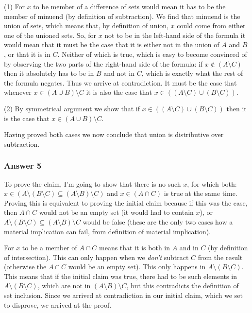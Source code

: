 \documentclass[11pt]{article}
\begin{document}
(1) For $x$ to be member of a difference of sets would mean it has to be the
member of minuend (by definition of subtraction).  We find that minuend is
the union of sets, which means that, by definition of union, $x$ could come
from either one of the unioned sets.  So, for $x$ not to be in the left-hand side
of the formula it would mean that it must be the case that it is either not in
the union of $A$ and $B$, or that it is in $C$.  Neither of which is true, which
is easy to become convinced of by observing the two parts of the right-hand side
of the formula: if $x \not \in (A \setminus C)$ then it absolutely has to be in
$B$ and not in $C$, which is exactly what the rest of the formula negates.
Thus we arrive at contradiction.  It must be the case that whenever
$x \in (A \cup B) \setminus C$ it is also the case that
$x \in ((A \setminus C) \cup (B \setminus C))$.

(2) By symmetrical argument we show that if
$x \in ((A \setminus C) \cup (B \setminus C))$ then it is the case that
$x \in (A \cup B) \setminus C$.

Having proved both cases we now conclude that union is distributive over
subtraction.
\subsubsection{Answer 5}
\label{sec-1-2-2}
To prove the claim, I'm going to show that there is no such $x$, for which
both:
$x \in (A \setminus (B \setminus C) \subseteq (A \setminus B) \setminus C)$
and $x \in (A \cap C)$ is true at the same time.  Proving this is equivalent
to proving the initial claim because if this was the case, then $A \cap C$
would not be an empty set (it would had to contain $x$), or
$A \setminus (B \setminus C) \subseteq (A \setminus B) \setminus C$ would be
false (these are the only two cases how a material implication can fail, from
definition of material implication).

For $x$ to be a member of $A \cap C$ means that it is both in $A$ and in $C$
(by definition of intersection).  This can only happen when we \emph{don't}
subtract $C$ from the result (otherwise the $A \cap C$ would be an empty set).
This only happens in $A \setminus (B \setminus C)$.  This means that if the
initial claim was true, there had to be such elements in
$A \setminus (B \setminus C)$, which are not in $(A \setminus B) \setminus C$,
but this contradicts the definition of set inclusion.  Since we arrived at
contradiction in our initial claim, which we set to disprove, we arrived at
the proof.
\end{document}
